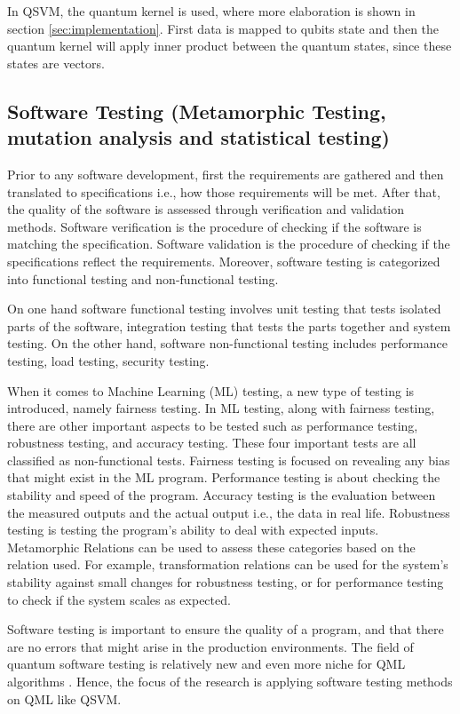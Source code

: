 \documentclass[12pt,a4paper]{article}
\begin{document}
	In QSVM, the quantum kernel is used, where more elaboration is shown in section \ref{sec:implementation}. First data is mapped to qubits state and then the quantum kernel will apply inner product between the quantum states, since these states are vectors.
	
	\subsection{Software Testing (Metamorphic Testing, mutation analysis and statistical testing)}
	
	Prior to any software development, first the requirements are gathered and then translated to specifications i.e., how those requirements will be met. After that, the quality of the software is assessed through verification and validation methods. Software verification is the procedure of checking if the software is matching the specification. Software validation is the procedure of checking if the specifications reflect the requirements. Moreover, software testing is categorized into functional testing and non-functional testing.
	
	On one hand software functional testing involves unit testing that tests isolated parts of the software, integration testing that tests the parts together and system testing. On the other hand, software non-functional testing includes performance testing, load testing, security testing.
	
	When it comes to Machine Learning (ML) testing, a new type of testing is introduced, namely fairness testing. In ML testing, along with fairness testing, there are other important aspects to be tested such as performance testing, robustness testing, and accuracy testing. These four important tests are all classified as non-functional tests. Fairness testing is focused on revealing any bias that might exist in the ML program. Performance testing is about checking the stability and speed of the program. Accuracy testing is the evaluation between the measured outputs and the actual output i.e., the data in real life. Robustness testing is testing the program's ability to deal with expected inputs. Metamorphic Relations can be used to assess these categories based on the relation used. For example, transformation relations can be used for the system's stability against small changes for robustness testing, or for performance testing to check if the system scales as expected.
	
	Software testing is important to ensure the quality of a program, and that there are no errors that might arise in the production environments. The field of quantum software testing is relatively new \cite{paltenghi2024surveytestinganalysisquantum} \cite{10.1145/3712002} and even more niche for QML algorithms \cite{zaman2025surveyquantummachinelearning} \cite{2021APS..MARS32013L}. Hence, the focus of the research is applying software testing methods on QML like QSVM. 
	
\end{document}
